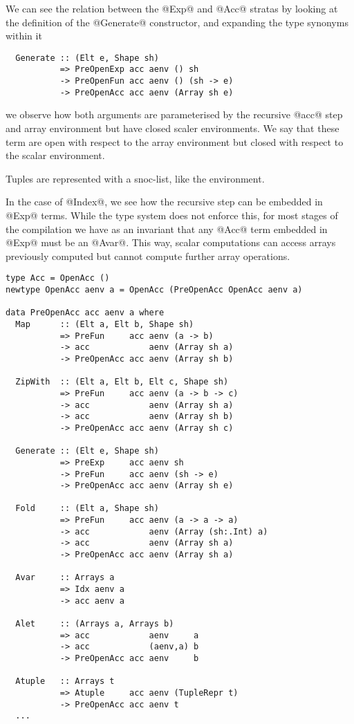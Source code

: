 We can see the relation between the @Exp@ and @Acc@ stratas by looking at the definition of the @Generate@ constructor, and expanding the type synonyms within it
%
\begin{lstlisting}
  Generate :: (Elt e, Shape sh)
           => PreOpenExp acc aenv () sh
           -> PreOpenFun acc aenv () (sh -> e)
           -> PreOpenAcc acc aenv (Array sh e)
\end{lstlisting}
%
we observe how both arguments are parameterised by the recursive @acc@ step and array environment but have closed scaler environments. We say that these term are open with respect to the array environment but closed with respect to the scalar environment.

Tuples are represented with a snoc-list, like the environment.

In the case of @Index@, we see how the recursive step can be embedded in @Exp@ terms. While the type system does not enforce this, for most stages of the compilation we have as an invariant that any @Acc@ term embedded in @Exp@ must be an @Avar@. This way, scalar computations can access arrays previously computed but cannot compute further array operations.


\begin{lstlisting}[label=lst:acc-ast, caption={The first-order abstract syntax of the \texttt{Acc} level of Accelerate.}, style=haskell]
type Acc = OpenAcc ()
newtype OpenAcc aenv a = OpenAcc (PreOpenAcc OpenAcc aenv a)

data PreOpenAcc acc aenv a where
  Map      :: (Elt a, Elt b, Shape sh)
           => PreFun     acc aenv (a -> b)
           -> acc            aenv (Array sh a)
           -> PreOpenAcc acc aenv (Array sh b)

  ZipWith  :: (Elt a, Elt b, Elt c, Shape sh)
           => PreFun     acc aenv (a -> b -> c)
           -> acc            aenv (Array sh a)
           -> acc            aenv (Array sh b)
           -> PreOpenAcc acc aenv (Array sh c)

  Generate :: (Elt e, Shape sh)
           => PreExp     acc aenv sh
           -> PreFun     acc aenv (sh -> e)
           -> PreOpenAcc acc aenv (Array sh e)

  Fold     :: (Elt a, Shape sh)
           => PreFun     acc aenv (a -> a -> a)
           -> acc            aenv (Array (sh:.Int) a)
           -> acc            aenv (Array sh a)
           -> PreOpenAcc acc aenv (Array sh a)

  Avar     :: Arrays a
           => Idx aenv a
           -> acc aenv a

  Alet     :: (Arrays a, Arrays b)
           => acc            aenv     a
           -> acc            (aenv,a) b
           -> PreOpenAcc acc aenv     b

  Atuple   :: Arrays t
           => Atuple     acc aenv (TupleRepr t)
           -> PreOpenAcc acc aenv t
  ...
\end{lstlisting}

